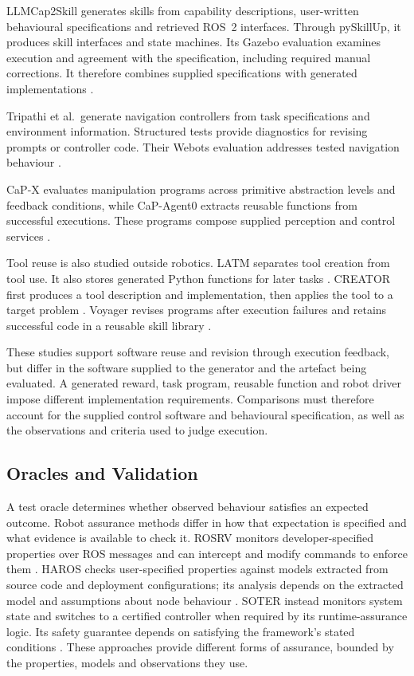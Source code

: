 LLMCap2Skill generates skills from capability descriptions, user-written
behavioural specifications and retrieved ROS~2 interfaces. Through pySkillUp,
it produces skill interfaces and state machines. Its Gazebo evaluation examines
execution and agreement with the specification, including required manual
corrections. It therefore combines supplied specifications with generated
implementations \citep{vieira2025cap2skill}.

Tripathi et al.\ generate navigation controllers from task specifications and
environment information. Structured tests provide diagnostics for revising
prompts or controller code. Their Webots evaluation addresses tested navigation
behaviour \citep{tripathi2026testdriven}.

CaP-X evaluates manipulation programs across primitive abstraction levels and
feedback conditions, while CaP-Agent0 extracts reusable functions from
successful executions. These programs compose supplied perception and control
services \citep{fu2026capx}.

Tool reuse is also studied outside robotics. LATM separates
tool creation from tool use. It also stores generated Python functions for later
tasks \citep{cai2023latm}. CREATOR first produces a tool description and
implementation, then applies the tool to a target problem
\citep{qian2023creator}. Voyager revises programs after execution failures and
retains successful code in a reusable skill library \citep{wang2023voyager}.

These studies support software reuse and revision through execution feedback,
but differ in the software supplied to the generator and the artefact being
evaluated. A generated reward, task program, reusable function and robot driver
impose different implementation requirements. Comparisons must therefore
account for the supplied control software and behavioural specification, as
well as the observations and criteria used to judge execution.

\subsection{Oracles and Validation}
\label{sec:oracles-validation}

A test oracle determines whether observed behaviour satisfies an expected
outcome. Robot assurance methods differ in how that expectation is specified
and what evidence is available to check it. ROSRV monitors developer-specified
properties over ROS messages and can intercept and modify commands to enforce
them \citep{huang2014rosrv}. HAROS checks user-specified properties against
models extracted from source code and deployment configurations; its analysis
depends on the extracted model and assumptions about node behaviour
\citep{santos2021haros}. SOTER instead monitors system state and switches to a
certified controller when required by its runtime-assurance logic. Its safety
guarantee depends on satisfying the framework's stated conditions
\citep{desai2019soter}. These approaches provide different forms of assurance,
bounded by the properties, models and observations they use.

